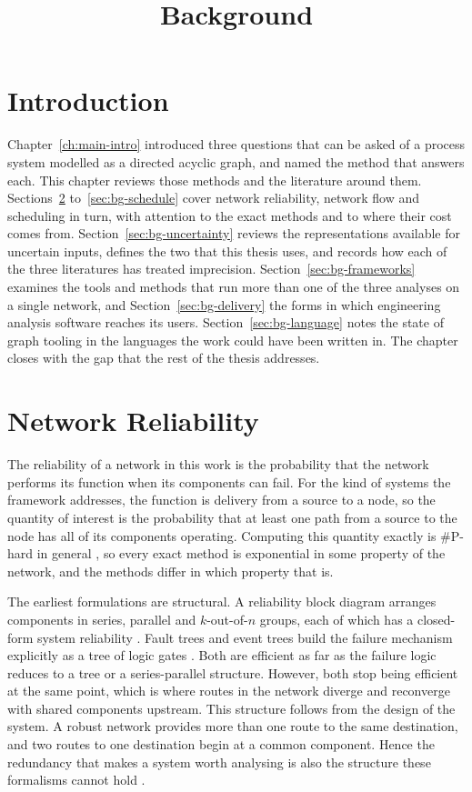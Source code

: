 \documentclass[12pt]{report}
\begin{document}
\title{Background}
\fi

\section{Introduction}
\label{sec:bg-intro}

Chapter~\ref{ch:main-intro} introduced three questions that can be asked of a process system
modelled as a directed acyclic graph, and named the method that answers each. This chapter
reviews those methods and the literature around them. Sections~\ref{sec:bg-reliability}
to~\ref{sec:bg-schedule} cover network reliability, network flow and scheduling in turn, with
attention to the exact methods and to where their cost comes from.
Section~\ref{sec:bg-uncertainty} reviews the representations available for uncertain inputs,
defines the two that this thesis uses, and records how each of the three literatures has
treated imprecision. Section~\ref{sec:bg-frameworks} examines the tools and methods that run
more than one of the three analyses on a single network, and Section~\ref{sec:bg-delivery}
the forms in which engineering analysis software reaches its users.
Section~\ref{sec:bg-language} notes the state of graph tooling in the languages the work could
have been written in. The chapter closes with the gap that the rest of the thesis addresses.

\section{Network Reliability}
\label{sec:bg-reliability}

The reliability of a network in this work is the probability that the network performs its
function when its components can fail. For the kind of systems the framework addresses, the
function is delivery from a source to a node, so the quantity of interest is the probability that at least one path from a source to
the node has all of its components operating. Computing this quantity exactly is \#P-hard in
general \cite{valiant1979complexity,ball1986computational}, so every exact method is exponential
in some property of the network, and the methods differ in which property that is.

The earliest formulations are structural. A reliability block diagram arranges components in
series, parallel and $k$-out-of-$n$ groups, each of which has a closed-form system reliability
\cite{billinton1992network}. Fault trees and event trees build the failure mechanism explicitly
as a tree of logic gates \cite{xing2008fault}. Both are efficient as far as the failure logic
reduces to a tree or a series-parallel structure. However, both stop being efficient at the
same point, which is where routes in the network diverge and reconverge with shared components
upstream. This structure follows from the design of the system. A robust network provides
more than one route to the same destination, and two routes to one destination begin at a
common component. Hence the redundancy that makes a system worth analysing is also the
structure these formalisms cannot hold \cite{ouyang2014interdependent,buldyrev2010cascade}.
\end{document}
